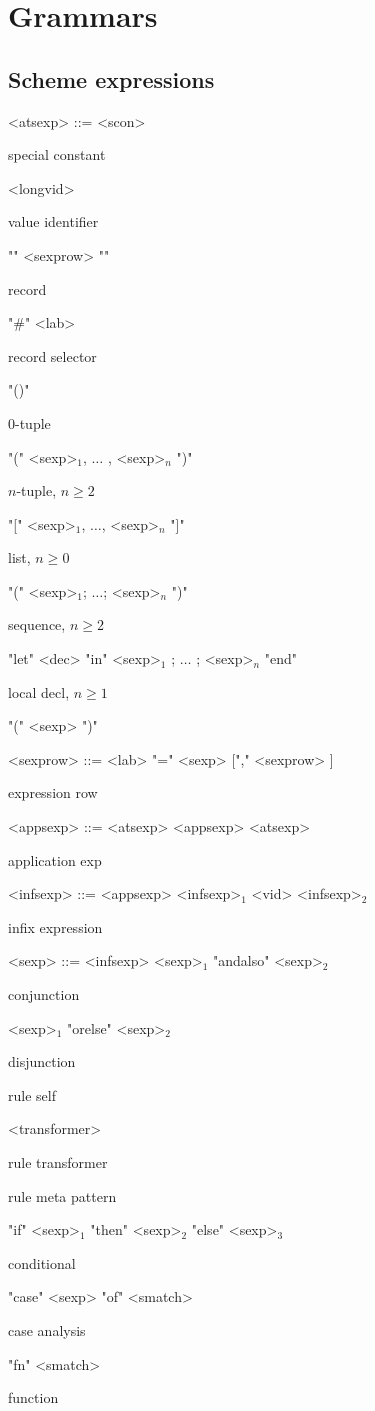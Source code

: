 \chapter{Grammars}

\section{Scheme expressions}

\begin{nonfloatingtable}

\setlength{\grammarindent}{7em}

\newcommand{\cmt}[1]{\parbox{8em}{\small{#1}}}

\begin{grammar}
 
  <atsexp> ::= <scon>                                            \hfill \cmt{special constant}
  \alt ["op"] <longvid>                                          \hfill \cmt{value identifier}
  \alt "{" <sexprow> "}"                                         \hfill \cmt{record}
  \alt "\#" <lab>                                                \hfill \cmt{record selector}
  \alt "()"                                                      \hfill \cmt{$0$-tuple}
  \alt "(" <sexp>$_1$, $\ldots$ , <sexp>$_n$ ")"                 \hfill \cmt{$n$-tuple, $n \geq 2$}
  \alt "[" <sexp>$_1$, $\ldots$, <sexp>$_n$ "]"                  \hfill \cmt{list, $n \geq 0$}
  \alt "(" <sexp>$_1$; $\ldots$; <sexp>$_n$ ")"                  \hfill \cmt{sequence, $n \geq 2$}  
  \alt "let" <dec> "in" <sexp>$_1$ ; $\ldots$ ; <sexp>$_n$ "end" \hfill \cmt{local decl, $n \geq 1$}
  \alt "(" <sexp> ")"
  
  <sexprow> ::= <lab> "=" <sexp> ["," <sexprow> ]          \hfill \cmt{expression row}

  <appsexp> ::= <atsexp>
  \alt <appsexp> <atsexp>                                  \hfill \cmt{application exp}

  <infsexp> ::= <appsexp>
  \alt <infsexp>$_1$ <vid> <infsexp>$_2$                   \hfill \cmt{infix expression}
  
  <sexp> ::= <infsexp>
  \alt <sexp>$_1$ "andalso" <sexp>$_2$                     \hfill \cmt{conjunction}
  \alt <sexp>$_1$ "orelse"  <sexp>$_2$                     \hfill \cmt{disjunction}
                                           \hfill \cmt{rule self}
  \alt <transformer>                                       \hfill \cmt{rule transformer}
                                   \hfill \cmt{rule meta pattern}
  \alt "if" <sexp>$_1$ "then" <sexp>$_2$ "else" <sexp>$_3$ \hfill \cmt{conditional}
  \alt "case" <sexp> "of" <smatch>                         \hfill \cmt{case analysis}
  \alt "fn" <smatch>                                       \hfill \cmt{function}
  

\end{grammar}
\end{nonfloatingtable}
